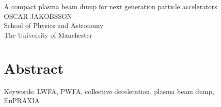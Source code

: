 A compact plasma beam dump for next generation particle accelerators \\
OSCAR JAKOBSSON\\
School of Physics and Astronomy\\
The University of Manchester \setlength{\parskip}{0.5cm}

\thispagestyle{plain}			%
\setlength{\parskip}{0pt plus 1.0pt}
\section*{Abstract}

\vfill
Keywords: LWFA, PWFA, collective deceleration, plasma beam dump, EuPRAXIA

\newpage				%
\thispagestyle{empty}
\mbox{}